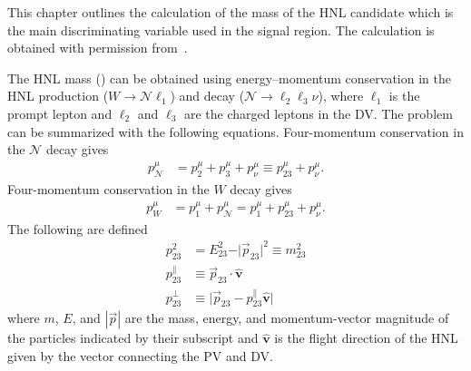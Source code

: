 This chapter outlines the calculation of the mass of the HNL candidate \mhnl which is the main discriminating variable used in the signal region. The calculation is obtained with permission from~\cite{PhysRevLett.131.061803}.

The HNL mass (\mhnl) can be obtained using energy--momentum conservation in the HNL production ($W \rightarrow \mathcal{N}\ell_1$) and decay ($\mathcal{N} \rightarrow \ell_2 \ell_3 \nu$), where $\ell_1$ is the prompt lepton and $\ell_2$ and $\ell_3$ are the charged leptons in the DV.
The problem can be summarized with the following equations. Four-momentum conservation in the $\mathcal{N}$ decay gives
\begin{align}
p^\mu_{\mathcal{N}}&=p^\mu_{2}+p^\mu_{3}+p^\mu_{ \nu } \equiv p^\mu_{23}+p^\mu_{\nu}.\label{eq:HNL4vec}
\end{align}
Four-momentum conservation in the $W$ decay gives
\begin{align}
p^\mu_{W}&=p^\mu_{1}+p^\mu_{\mathcal{N}} =  p^\mu_{1} + p^\mu_{23} +p^\mu_{ \nu }.\label{eq:W4vec}
\end{align}
%
The following are defined
%
\begin{align}
p_{23}^{2}&=E_{23}^{2}- \vert \vec{p}_{23} \vert ^{2} \equiv m_{23}^{2} \nonumber \\
p_{23}^{\parallel} &\equiv \vec{p}_{23}\cdot\bm{\hat{v}} \nonumber \\
p_{23}^{\bot} &\equiv  \vert \vec{p}_{23}-p_{23}^{\parallel}\bm{\hat{v}} \vert \nonumber
\end{align}
%
where $m$, $E$, and $|\vec p|$ are the mass, energy, and momentum-vector magnitude of the particles indicated by their subscript and $\bm{\hat{v}}$ is the flight direction of the HNL given by the vector connecting the PV and DV.

